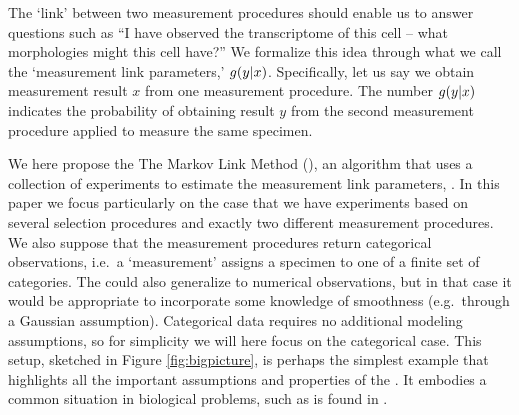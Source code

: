 The `link' between two measurement procedures should enable us to answer questions such as ``I have observed the transcriptome of this cell -- what morphologies might this cell have?''  We formalize this idea through what we call the `measurement link parameters,' $g(y|x)$.  Specifically, let us say we obtain measurement result $x$ from one measurement procedure.  The number $g(y|x)$ indicates the probability of obtaining result $y$ from the second measurement procedure applied to measure the same specimen.  

We here propose the The Markov Link Method (\MLM), an algorithm that uses a collection of experiments to estimate the measurement link parameters, \pxy.  In this paper we focus particularly on the case that we have experiments based on several selection procedures and exactly two different measurement procedures.  We also suppose that the measurement procedures return categorical observations, i.e.\ a `measurement' assigns a specimen to one of a finite set of categories.  The \MLM{} could also generalize to numerical observations, but in that case it would be appropriate to incorporate some knowledge of smoothness (e.g.\ through a Gaussian assumption).  Categorical data requires no additional modeling assumptions, so for simplicity we will here focus on the categorical case.  This setup, sketched in Figure \ref{fig:bigpicture}, is perhaps the simplest example that highlights all the important assumptions and properties of the \MLM.  It embodies a common situation in biological problems, such as is found in \cite{gouwens2018classification}. 

